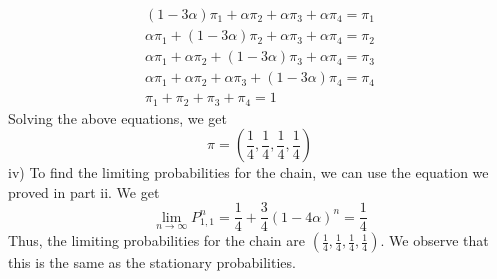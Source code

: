 \documentclass[answers,12pt,addpoints]{exam}
\begin{document}
\begin{questions}
\begin{align*}
    (1-3\alpha)\pi_1 + \alpha\pi_2 + \alpha\pi_3 + \alpha\pi_4 = \pi_1\\
    \alpha\pi_1 + (1-3\alpha)\pi_2 + \alpha\pi_3 + \alpha\pi_4 = \pi_2\\
    \alpha\pi_1 + \alpha\pi_2 + (1-3\alpha)\pi_3 + \alpha\pi_4 = \pi_3\\
    \alpha\pi_1 + \alpha\pi_2 + \alpha\pi_3 + (1-3\alpha)\pi_4 = \pi_4\\
    \pi_1 + \pi_2 + \pi_3 + \pi_4 = 1
\end{align*}
Solving the above equations, we get
$$\pi = \left(\frac{1}{4}, \frac{1}{4}, \frac{1}{4}, \frac{1}{4}\right)$$
iv) To find the limiting probabilities for the chain, we can use the equation we proved in part ii. We get
$$\lim_{n \to \infty} P_{1,1}^n = \frac{1}{4} + \frac{3}{4}(1-4\alpha)^n = \frac{1}{4}$$
Thus, the limiting probabilities for the chain are $\left(\frac{1}{4}, \frac{1}{4}, \frac{1}{4}, \frac{1}{4}\right)$. We observe that this is the same as the stationary probabilities.
 



\end{questions}
\end{document}
